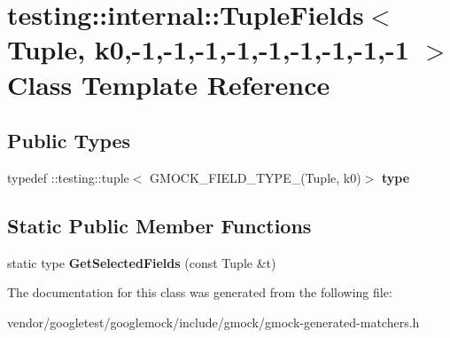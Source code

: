 \hypertarget{classtesting_1_1internal_1_1TupleFields_3_01Tuple_00_01k0_00-1_00-1_00-1_00-1_00-1_00-1_00-1_00-1_00-1_01_4}{}\section{testing\+:\+:internal\+:\+:Tuple\+Fields$<$ Tuple, k0,-\/1,-\/1,-\/1,-\/1,-\/1,-\/1,-\/1,-\/1,-\/1 $>$ Class Template Reference}
\label{classtesting_1_1internal_1_1TupleFields_3_01Tuple_00_01k0_00-1_00-1_00-1_00-1_00-1_00-1_00-1_00-1_00-1_01_4}
\subsection*{Public Types}
\begin{DoxyCompactItemize}
\item 
typedef \+::testing\+::tuple$<$ G\+M\+O\+C\+K\+\_\+\+F\+I\+E\+L\+D\+\_\+\+T\+Y\+P\+E\+\_\+(Tuple, k0)$>$ {\bfseries type}\hypertarget{classtesting_1_1internal_1_1TupleFields_3_01Tuple_00_01k0_00-1_00-1_00-1_00-1_00-1_00-1_00-1_00-1_00-1_01_4_aae8b0b52bdcdfeeaca4509a079ca0e89}{}\label{classtesting_1_1internal_1_1TupleFields_3_01Tuple_00_01k0_00-1_00-1_00-1_00-1_00-1_00-1_00-1_00-1_00-1_01_4_aae8b0b52bdcdfeeaca4509a079ca0e89}

\end{DoxyCompactItemize}
\subsection*{Static Public Member Functions}
\begin{DoxyCompactItemize}
\item 
static type {\bfseries Get\+Selected\+Fields} (const Tuple \&t)\hypertarget{classtesting_1_1internal_1_1TupleFields_3_01Tuple_00_01k0_00-1_00-1_00-1_00-1_00-1_00-1_00-1_00-1_00-1_01_4_ab1f21f40fbfe71554403bf8a4c5bd980}{}\label{classtesting_1_1internal_1_1TupleFields_3_01Tuple_00_01k0_00-1_00-1_00-1_00-1_00-1_00-1_00-1_00-1_00-1_01_4_ab1f21f40fbfe71554403bf8a4c5bd980}

\end{DoxyCompactItemize}


The documentation for this class was generated from the following file\+:\begin{DoxyCompactItemize}
\item 
vendor/googletest/googlemock/include/gmock/gmock-\/generated-\/matchers.\+h\end{DoxyCompactItemize}
